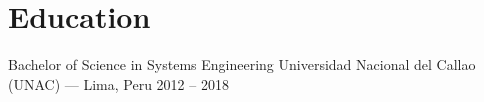 
\section{Education}

\cvEduEntry%
  {Bachelor of Science in Systems Engineering}%
  {Universidad Nacional del Callao (UNAC) --- Lima, Peru}%
  {2012 -- 2018}

